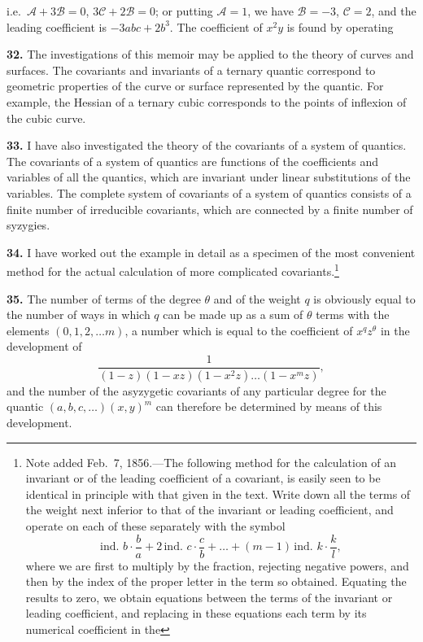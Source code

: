 \documentclass[11pt,a4paper]{book}
\begin{document}
\newpage
\setcounter{page}{259}

i.e.\ $\mathcal{A} + 3\mathcal{B} = 0$, $3\mathcal{C} + 2\mathcal{B} = 0$; or putting $\mathcal{A} = 1$, we have $\mathcal{B} = -3$, $\mathcal{C} = 2$, and the leading coefficient is $-3abc + 2b^3$. The coefficient of $x^2y$ is found by operating

\textbf{32.} The investigations of this memoir may be applied to the theory of curves and surfaces. The covariants and invariants of a ternary quantic correspond to geometric properties of the curve or surface represented by the quantic. For example, the Hessian of a ternary cubic corresponds to the points of inflexion of the cubic curve.

\textbf{33.} I have also investigated the theory of the covariants of a system of quantics. The covariants of a system of quantics are functions of the coefficients and variables of all the quantics, which are invariant under linear substitutions of the variables. The complete system of covariants of a system of quantics consists of a finite number of irreducible covariants, which are connected by a finite number of syzygies.

\newpage
\setcounter{page}{260}

\textbf{34.} I have worked out the example in detail as a specimen of the most convenient method for the actual calculation of more complicated covariants.\footnote{Note added Feb.\ 7, 1856.---The following method for the calculation of an invariant or of the leading coefficient of a covariant, is easily seen to be identical in principle with that given in the text. Write down all the terms of the weight next inferior to that of the invariant or leading coefficient, and operate on each of these separately with the symbol
\[
\text{ind.\ } b \cdot \frac{b}{a} + 2\, \text{ind.\ } c \cdot \frac{c}{b} + \ldots + (m-1)\, \text{ind.\ } k \cdot \frac{k}{l},
\]
where we are first to multiply by the fraction, rejecting negative powers, and then by the index of the proper letter in the term so obtained. Equating the results to zero, we obtain equations between the terms of the invariant or leading coefficient, and replacing in these equations each term by its numerical coefficient in the}

\textbf{35.} The number of terms of the degree $\theta$ and of the weight $q$ is obviously equal to the number of ways in which $q$ can be made up as a sum of $\theta$ terms with the elements $(0, 1, 2, \ldots m)$, a number which is equal to the coefficient of $x^q z^{\theta}$ in the development of
\[
\frac{1}{(1-z)(1-xz)(1-x^2z)\ldots(1-x^mz)},
\]
and the number of the asyzygetic covariants of any particular degree for the quantic $(a, b, c, \ldots)(x, y)^m$ can therefore be determined by means of this development.
\end{document}
